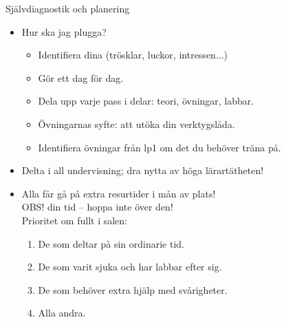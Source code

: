 \begin{Slide}{Självdiagnostik och planering}
\begin{itemize}
  \item Hur ska jag plugga?
  \begin{itemize}
    \item Identifiera dina  (trösklar, luckor, intressen...)
    \item Gör ett  dag för dag.
    \item Dela upp varje pass i delar: teori, övningar, labbar. 
    \item Övningarnas syfte: att utöka din verktygslåda.
    \item Identifiera övningar från lp1 om det du behöver träna på.
  \end{itemize}
  \item Delta i all undervisning; dra nytta av höga lärartätheten!
  \item Alla får gå på extra resurtider i mån av plats!\\OBS!  din  tid -- hoppa inte över den!\\Prioritet om fullt i salen:
  \begin{enumerate}
    \item De som deltar på sin ordinarie tid.
    \item De som varit sjuka och har labbar efter sig.
    \item De som behöver extra hjälp med svårigheter.
    \item Alla andra.
  \end{enumerate}
\end{itemize}
\end{Slide}


